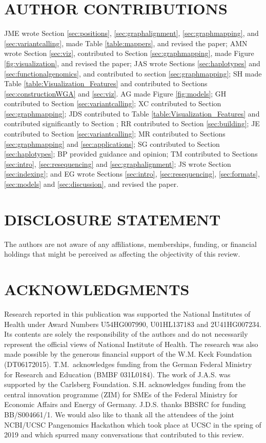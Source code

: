 

\section*{AUTHOR CONTRIBUTIONS}

JME wrote Section \ref{sec:positions}, \ref{sec:graphalignment}, \ref{sec:graphmapping}, and \ref{sec:variantcalling}, made Table \ref{table:mappers}, and revised the paper;
AMN wrote Section \ref{sec:viz}, contributed to Section \ref{sec:graphmapping}, made Figure \ref{fig:visualization}, and revised the paper;
JAS wrote Sections \ref{sec:haplotypes} and \ref{sec:functionalgenomics}, and contributed to section \ref{sec:graphmapping};
SH made Table \ref{table:Visualization_Features} and contributed to Sections \ref{sec:constructionWGA} and \ref{sec:viz}.
AG made Figure \ref{fig:models};
GH contributed to Section \ref{sec:variantcalling};
XC contributed to Section \ref{sec:graphmapping};
JDS contributed to Table \ref{table:Visualization_Features} and contributed significantly to Section \label{sec:viz};
RR contributed to Section \ref{sec:building};
JE contributed to Section \ref{sec:variantcalling};
MR contributed to Sections \ref{sec:graphmapping} and \ref{sec:applications};
SG contributed to Section \ref{sec:haplotypes};
BP provided guidance and opinion;
TM contributed to Sections  \ref{sec:intro}, \ref{sec:resequencing} and \ref{sec:graphalignment};
JS wrote Section \ref{sec:indexing};
and EG wrote Sections \ref{sec:intro}, \ref{sec:resequencing}, \ref{sec:formats}, \ref{sec:models} and \ref{sec:discussion}, and revised the paper.

\section*{DISCLOSURE STATEMENT}
The authors are not aware of any affiliations, memberships, funding, or financial holdings that
might be perceived as affecting the objectivity of this review. 

\section*{ACKNOWLEDGMENTS}
Research reported in this publication was supported the National Institutes of Health under Award Numbers U54HG007990, U01HL137183 and 2U41HG007234.
Its contents are solely the responsibility of the authors and do not necessarily represent the official views of National Institute of Health.
The research was also made possible by the generous financial support of the W.M. Keck Foundation (DT06172015).
T.M.\ acknowledges funding from the German Federal Ministry for Research and Education (BMBF 031L0184).
The work of J.A.S. was supported by the Carlsberg Foundation.
S.H. acknowledges funding from the central innovation programme (ZIM) for SMEs of the Federal Ministry for Economic Affairs and Energy of Germany.
J.D.S. thanks BBSRC for funding BB/S004661/1.
We would also like to thank all the attendees of the joint NCBI/UCSC Pangenomics Hackathon which took place at UCSC in the spring of 2019 and which spurred many conversations that contributed to this review.
